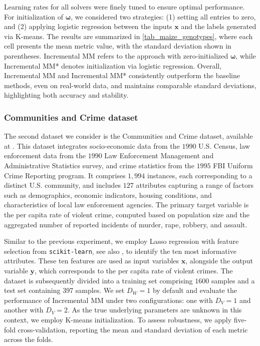 \documentclass{article}
\def\vomega{{\bm{\omega}}}
\def\vx{{\bm{x}}}
\def\vy{{\bm{y}}}
\begin{document}
Learning rates for all solvers were finely tuned to ensure optimal performance. For initialization of \( \vomega \), we considered two strategies: (1) setting all entries to zero, and (2) applying logistic regression between the inputs \( \vx \) and the labels generated via K-means. The results are summarized in \cref{tab_maize_genotypes}, where each cell presents the mean metric value, with the standard deviation shown in parentheses. Incremental MM refers to the approach with zero-initialized \( \vomega \), while Incremental MM* denotes initialization via logistic regression. Overall, Incremental MM and Incremental MM* consistently outperform the baseline methods, even on real-world data, and maintains comparable standard deviations, highlighting both accuracy and stability.


\subsubsection{Communities and Crime dataset}
The second dataset we consider is the Communities and Crime dataset, available at \cite{communities_and_crime_183}. This dataset integrates socio-economic data from the $1990$ U.S. Census, law enforcement data from the $1990$ Law Enforcement Management and Administrative Statistics survey, and crime statistics from the $1995$ FBI Uniform Crime Reporting program. It comprises $1,994$ instances, each corresponding to a distinct U.S. community, and includes $127$ attributes capturing a range of factors such as demographics, economic indicators, housing conditions, and characteristics of local law enforcement agencies. The primary target variable is the per capita rate of violent crime, computed based on population size and the aggregated number of reported incidents of murder, rape, robbery, and assault.

Similar to the previous experiment, we employ Lasso regression with feature selection from \texttt{scikit-learn}, see also \cite{friedman_regularization_2010,tibshirani_regression_1996}, to identify the ten most informative attributes. These ten features are used as input variables $\vx$, alongside the output variable $\vy$, which corresponds to the per capita rate of violent crimes. The dataset is subsequently divided into a training set comprising $1600$ samples and a test set containing 397 samples. We set $D_W = 1$ by default and evaluate the performance of Incremental MM under two configurations: one with $D_V = 1$ and another with $D_V = 2$. As the true underlying parameters are unknown in this context, we employ K-means initialization.
To assess robustness, we apply five-fold cross-validation, reporting the mean and standard deviation of each metric across the folds.
\end{document}
